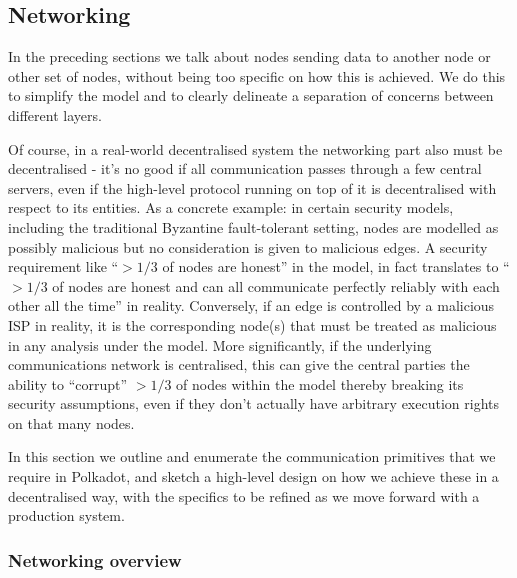 \subsection{Networking}\label{sec:networking}

In the preceding sections we talk about nodes sending data to another node or
other set of nodes, without being too specific on how this is achieved. We do
this to simplify the model and to clearly delineate a separation of concerns
between different layers.

Of course, in a real-world decentralised system the networking part also must
be decentralised - it's no good if all communication passes through a few
central servers, even if the high-level protocol running on top of it is
decentralised with respect to its entities. As a concrete example: in certain
security models, including the traditional Byzantine fault-tolerant setting,
nodes are modelled as possibly malicious but no consideration is given to
malicious edges. A security requirement like “$> 1/3$ of nodes are honest” in
the model, in fact translates to “$> 1/3$ of nodes are honest and can all
communicate perfectly reliably with each other all the time” in reality.
Conversely, if an edge is controlled by a malicious ISP in reality, it is the
corresponding node(s) that must be treated as malicious in any analysis under
the model. More significantly, if the underlying communications network is
centralised, this can give the central parties the ability to “corrupt” $> 1/3$
of nodes within the model thereby breaking its security assumptions, even if
they don't actually have arbitrary execution rights on that many nodes.

In this section we outline and enumerate the communication primitives that we
require in Polkadot, and sketch a high-level design on how we achieve these in
a decentralised way, with the specifics to be refined as we move forward with a
production system.

\subsubsection{Networking overview}

